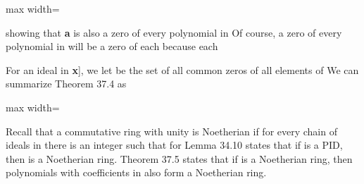 \documentclass[11pt,oneside]{article}
\begin{document}
\begin{BookBody}
\begin{center}\begin{adjustbox}{max width=\linewidth}\end{adjustbox}\end{center}

\noindent showing that\textbf{ a} is also a zero of every polynomial  in  Of course, a zero of every polynomial in  will be a zero of each  because each \BookEnd{\blacklozenge}

For an ideal  in \BookInline{F[}\textbf{x}], we let  be the set of all common zeros of all elements of  We can summarize Theorem 37.4 as

\begin{center}\begin{adjustbox}{max width=\linewidth}\end{adjustbox}\end{center}

\noindent Recall that a commutative ring with unity is Noetherian if for every chain   of ideals in  there is an integer  such that for  Lemma 34.10 
states that if  is a PID, then  is a Noetherian ring. Theorem 37.5 states that if  is a Noetherian ring, then polynomials with coefficients in  also form a Noetherian ring.

\end{BookBody}

\BookNarrativetrue
\end{document}

